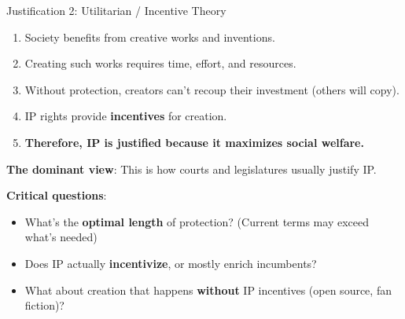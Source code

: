 ﻿\documentclass[aspectratio=169,11pt]{beamer}
\begin{document}
\begin{frame}[shrink=8]{Justification 2: Utilitarian / Incentive Theory}
\begin{argumentbox}
\begin{enumerate}
    \item Society benefits from creative works and inventions.
    \item Creating such works requires time, effort, and resources.
    \item Without protection, creators can't recoup their investment (others will copy).
    \item IP rights provide \textbf{incentives} for creation.
    \item[\textbf{C.}] \textbf{Therefore, IP is justified because it maximizes social welfare.}
\end{enumerate}
\end{argumentbox}

\vspace{0.2cm}
\textbf{The dominant view}: This is how courts and legislatures usually justify IP.

\vspace{0.2cm}
\textbf{Critical questions}:
\begin{itemize}
    \item What's the \textbf{optimal length} of protection? (Current terms may exceed what's needed)
    \item Does IP actually \textbf{incentivize}, or mostly enrich incumbents?
    \item What about creation that happens \textbf{without} IP incentives (open source, fan fiction)?
\end{itemize}
\end{frame}
\end{document}
